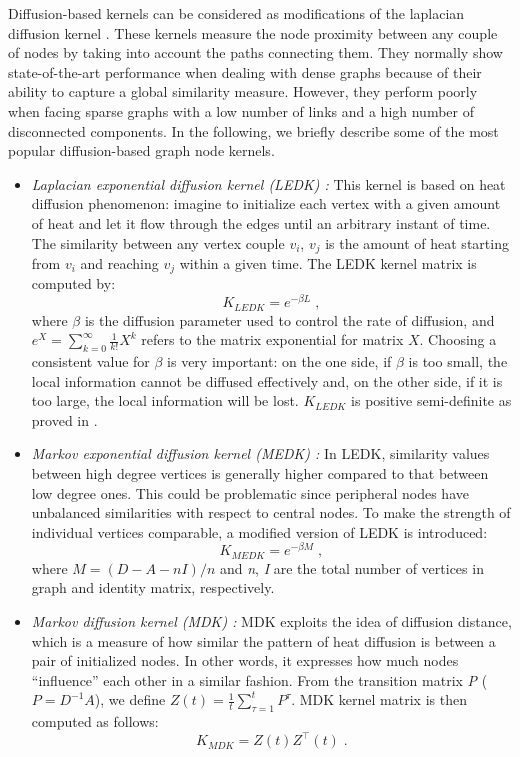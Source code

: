 Diffusion-based kernels can be considered as modifications of the laplacian diffusion kernel \cite{proceeding2}. These kernels measure the node proximity between any couple of nodes by taking into account the paths connecting them. They normally show state-of-the-art performance when dealing with dense graphs because of their ability to capture a global similarity measure. However, they perform poorly  when facing  sparse graphs with a low number of links and a high number of disconnected components. In the following, we briefly describe some of the most popular diffusion-based graph node kernels.
\begin{itemize}
\item \textit{Laplacian exponential diffusion kernel (LEDK) \cite{proceeding2}:} This kernel is based on heat diffusion phenomenon: imagine to initialize each vertex with a given amount of heat and let it flow through the edges until an arbitrary instant of time. The similarity between any vertex couple $v_{i}$, $v_{j}$ is the amount of heat starting from $v_{i}$ and reaching $v_{j}$ within a given time. The LEDK kernel matrix is computed by:
\begin{equation}
K_{LEDK} = e^{-\beta L}\; ,
\end{equation}
where $\beta$ is the diffusion parameter used to control the rate of diffusion, and $e^{X}=\sum_{k=0}^{\infty} \frac{1}{k!}X^k$ refers to the matrix exponential for matrix $X$. Choosing a consistent value for $\beta$ is very important: on the one side, if $\beta$ is too small, the local information cannot be diffused effectively and, on the other side, if it is too large, the local information will be lost. $K_{LEDK}$ is positive semi-definite as proved in \cite{proceeding2}.

\item \textit{Markov exponential diffusion kernel (MEDK) \cite{proceeding3}:} In LEDK, similarity values between high degree vertices is generally higher compared to that between low degree ones. This could be problematic since peripheral nodes have unbalanced similarities with respect to central nodes. To make the strength of individual vertices comparable, a modified version of LEDK is introduced:
\begin{equation}
K_{MEDK} = e^{-\beta M}\; ,
\end{equation}
where $M = (D-A-nI)/n$ and \textit{n}, \textit{I} are the total number of vertices in graph and identity matrix, respectively.

\item \textit{Markov diffusion kernel (MDK) \cite{jour3}:} MDK exploits the idea of diffusion distance, which is a measure of how similar the pattern of heat diffusion is between a pair of initialized nodes. In other words, it expresses how much nodes ``influence'' each other in a similar fashion. From the transition matrix \textit{P} ($P = D^{-1} A$), we define $Z(t) = \frac{1}{t}\sum_{\tau=1}^{t} P^{\tau}$. MDK kernel matrix is then computed as follows:
\begin{equation}
K_{MDK} = Z(t) Z^{\top}(t)\; .
\end{equation}


\end{itemize}
